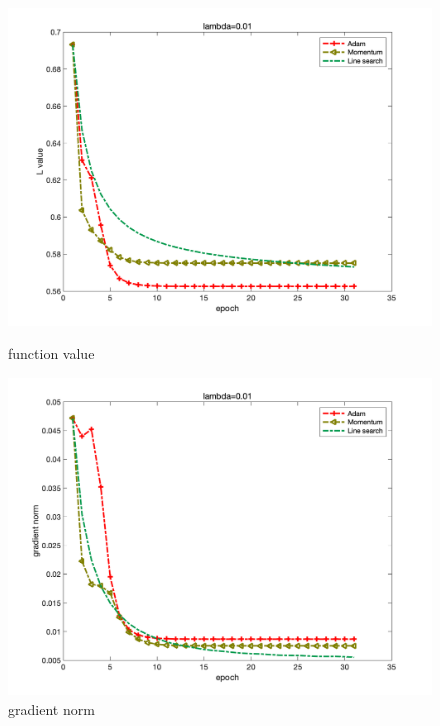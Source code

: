 \documentclass{article}
\begin{document}
\begin{figure}[H]
	\begin{minipage}{0.33\linewidth}
		\centering
		\includegraphics[width=1\linewidth]{./fig/fval_c4}
		\caption{function value}
	\end{minipage}
	\begin{minipage}{0.33\linewidth}
		\centering
		\includegraphics[width=1\linewidth]{./fig/gnorm_c4}
		\caption{gradient norm}
	\end{minipage}
	\begin{minipage}{0.33\linewidth}
		\centering

\end{minipage}
\end{figure}
\end{document}

